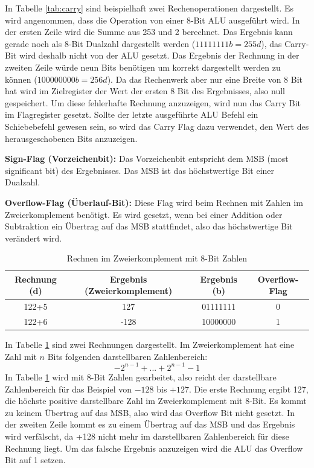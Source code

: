 \documentclass[a4paper,12pt]{article}
\begin{document}
\noindent In Tabelle \ref{tab:carry} sind beispielhaft zwei Rechenoperationen dargestellt. Es wird angenommen, dass die Operation von einer 8-Bit ALU ausgeführt wird. In der ersten Zeile wird die Summe aus 253 und 2 berechnet. Das Ergebnis kann gerade noch als 8-Bit Dualzahl dargestellt werden ($11111111b = 255d$), das Carry-Bit wird deshalb nicht von der ALU gesetzt. Das Ergebnis der Rechnung in der zweiten Zeile  würde neun Bits benötigen um korrekt dargestellt werden zu können ($100000000b = 256d$). Da das Rechenwerk aber nur eine Breite von 8 Bit hat wird im Zielregister der Wert der ersten 8 Bit des Ergebnisses, also null gespeichert. Um diese fehlerhafte Rechnung anzuzeigen, wird nun das Carry Bit im Flagregister gesetzt.  
Sollte der letzte ausgeführte ALU Befehl ein Schiebebefehl gewesen sein, so wird das Carry Flag dazu verwendet, den Wert des herausgeschobenen Bits anzuzeigen.

\par\bigskip\noindent \textbf{Sign-Flag (Vorzeichenbit):} Das Vorzeichenbit entspricht dem MSB (most significant bit) des Ergebnisses. Das MSB ist das höchstwertige Bit einer Dualzahl.

 \par\bigskip\noindent \textbf{Overflow-Flag (Überlauf-Bit):} Diese Flag wird beim Rechnen mit Zahlen im Zweierkomplement benötigt. Es wird gesetzt, wenn bei einer Addition oder Subtraktion ein Übertrag auf das MSB stattfindet, also das höchstwertige Bit verändert wird. 
\begin{table}[!htb]
\centering
\begin{tabular}{|c|c|c|c|}
\hline
Rechnung (d) & Ergebnis (Zweierkomplement) & Ergebnis (b) & Overflow-Flag \\ \hline 
122+5        & 127                         & 01111111     & 0            \\ \hline 
122+6        & -128                        & 10000000      & 1            \\ \hline

\end{tabular}
\caption{Rechnen im Zweierkomplement mit 8-Bit Zahlen}

\label{tab:overflow}
\end{table}

\noindent In Tabelle \ref{tab:overflow} sind zwei Rechnungen dargestellt. Im Zweierkomplement hat eine Zahl mit $n$ Bits folgenden darstellbaren Zahlenbereich: 
$${-2}^{n-1}+ ... +2^{n-1}-1$$
In Tabelle \ref{tab:overflow} wird mit 8-Bit Zahlen gearbeitet, also reicht der darstellbare Zahlenbereich für das Beispiel von $-128$ bis $+127$. Die erste Rechnung ergibt 127, die höchste positive darstellbare Zahl im Zweierkomplement mit 8-Bit. Es kommt zu keinem Übertrag auf das MSB, also wird das Overflow Bit nicht gesetzt. In der zweiten Zeile kommt es zu einem Übertrag auf das MSB und das Ergebnis wird verfälscht, da +128 nicht mehr im darstellbaren Zahlenbereich für diese Rechnung liegt. Um das falsche Ergebnis anzuzeigen wird die ALU das Overflow Bit auf 1 setzen. 
\end{document}
